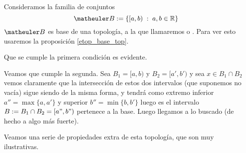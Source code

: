 \begin{exa}
	\label{etop_ej_sorgenfrey}
	
	Consideramos la familia de conjuntos \begin{equation}\B:=\{[a,b)\midc a,b\in\R\}\end{equation}
	$\B$ es base de una topología, a la que llamaremos \tbitop[$\T_{[,)}$]{de Sorgenfrey} o . Para ver esto usaremos la proposición \ref{etop_base_top}.
		
	Que se cumple la primera condición es evidente.
		
	Veamos que cumple la segunda. Sea $B_1=[a,b)$ y $B_2=[a',b')$ y sea $x \in B_1 \cap B_2$ vemos claramente que la intersección de estos dos intervalos (que suponemos no vacía) sigue siendo de la misma forma, y tendrá como extremo inferior $a'' = \max\{a,a'\} $ y superior $b''=\min\{b,b'\}$ luego es el intervalo $B:=B_1 \cap B_2 = [a",b")$ pertenece a la base. Luego llegamos a lo buscado (de hecho a algo más fuerte).
	\end{exa}
	Veamos una serie de propiedades extra de esta topología, que son muy ilustrativas.
